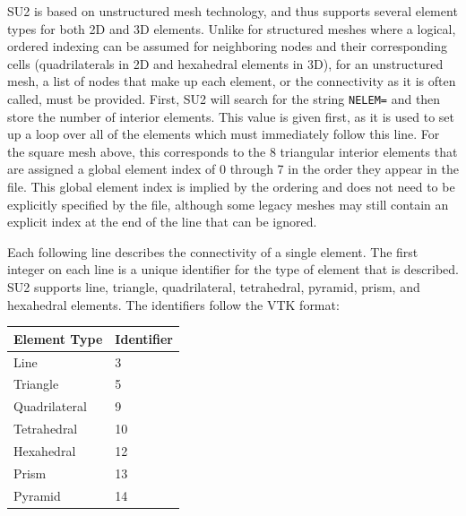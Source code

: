 \documentclass{article}
\begin{document}
SU2 is based on unstructured mesh technology, and thus supports several element types for both 2D and 3D elements. Unlike for structured meshes where a logical, ordered indexing can be assumed for neighboring nodes and their corresponding cells (quadrilaterals in 2D and hexahedral elements in 3D), for an unstructured mesh, a list of nodes that make up each element, or the connectivity as it is often called, must be provided. First, SU2 will search for the string \verb|NELEM=| and then store the number of interior elements. This value is given first, as it is used to set up a loop over all of the elements which must immediately follow this line. For the square mesh above, this corresponds to the 8 triangular interior elements that are assigned a global element index of 0 through 7 in the order they appear in the file. This global element index is implied by the ordering and does not need to be explicitly specified by the file, although some legacy meshes may still contain an explicit index at the end of the line that can be ignored.

Each following line describes the connectivity of a single element. The first integer on each line is a unique identifier for the type of element that is described. SU2 supports line, triangle, quadrilateral, tetrahedral, pyramid, prism, and hexahedral elements. The identifiers follow the VTK format:


\begin{center}
    \begin{tabular}{| m{12em} | m{17em} |}
    \textbf{Element Type} & \textbf{Identifier}  \\ [0.5ex]
    \hline\hline 
    Line & 3 \\ [1ex]
    \hline
    Triangle & 5 \\ [1ex]
    \hline
    Quadrilateral & 9\\ [1ex]
    \hline
    Tetrahedral & 10 \\ [1ex]
    \hline
    Hexahedral & 12 \\ [1ex]
    \hline
    Prism & 13 \\ [1ex]
    \hline
    Pyramid & 14 \\ [1ex]
    \hline

    \end{tabular}
\end{center}
\end{document}
